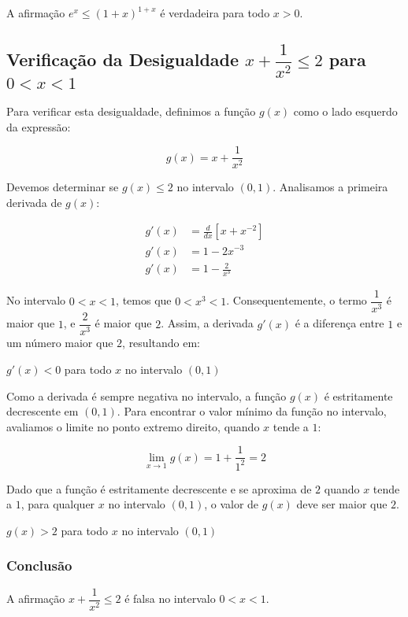 \documentclass[../resumo.tex]{subfiles}
\begin{document}
	A afirmação $e^x \leq (1+x)^{1+x}$ é verdadeira para todo $x > 0$.

	\subsection{Verificação da Desigualdade $x + \dfrac{1}{x^2} \leq 2$ para $0 < x < 1$}

	Para verificar esta desigualdade, definimos a função $g(x)$ como o lado esquerdo da expressão:

	\[ g(x) = x + \frac{1}{x^2} \]

	Devemos determinar se $g(x) \leq 2$ no intervalo $(0, 1)$. Analisamos a primeira derivada de $g(x)$:

	\begin{align*}
		g'(x) &= \frac{d}{dx}[x + x^{-2}] \\
		g'(x) &= 1 - 2x^{-3} \\
		g'(x) &= 1 - \frac{2}{x^3}
	\end{align*}

	No intervalo $0 < x < 1$, temos que $0 < x^3 < 1$. Consequentemente, o termo $\dfrac{1}{x^3}$ é
	maior que $1$, e $\dfrac{2}{x^3}$ é maior que $2$. Assim, a derivada $g'(x)$ é a diferença
	entre $1$ e um número maior que $2$, resultando em:

	$g'(x) < 0$ para todo $x$ no intervalo $(0, 1)$

	Como a derivada é sempre negativa no intervalo, a função $g(x)$ é estritamente decrescente em $(0, 1)$.
	Para encontrar o valor mínimo da função no intervalo, avaliamos o limite no ponto extremo direito,
	quando $x$ tende a $1$:

	\[ \lim_{x\to1} g(x) = 1 + \frac{1}{1^2} = 2 \]

	Dado que a função é estritamente decrescente e se aproxima de $2$ quando $x$ tende a $1$, para qualquer $x$
	no intervalo $(0, 1)$, o valor de $g(x)$ deve ser maior que $2$.

	$g(x) > 2$ para todo $x$ no intervalo $(0, 1)$

	\subsubsection{Conclusão}

	A afirmação $x + \dfrac{1}{x^2} \leq 2$ é falsa no intervalo $0 < x < 1$.
\end{document}
